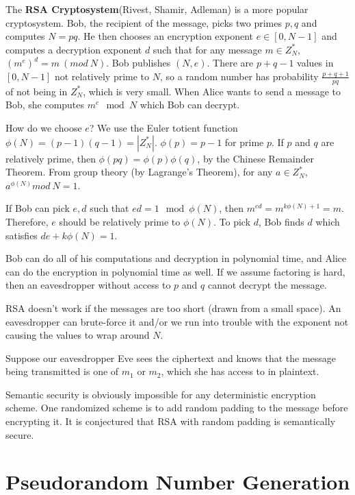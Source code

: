 \documentclass[twoside]{article}
\begin{document}
The \textbf{RSA Cryptosystem}(Rivest, Shamir, Adleman) is a more popular cryptosystem.  Bob, the recipient of the message, picks two primes $p,q$ and computes $N=pq$.  He then chooses an encryption exponent $e\in [0,N-1]$ and computes a decryption exponent $d$ such that for any message $m\in Z_N^*$, $(m^e)^d=m\ (mod\  N)$.  Bob publishes $(N,e)$.  There are $p+q-1$ values in $[0,N-1]$ not relatively prime to $N$, so a random number has probability $\frac{p+q+1}{pq}$ of not being in $Z_N^*$, which is very small.  When Alice wants to send a message to Bob, she computes $m^e\mod N$ which Bob can decrypt.

How do we choose $e$?  We use the Euler totient function $\phi(N)=(p-1)(q-1)=|Z_N^*|$.  $\phi(p)=p-1$ for prime $p$.  If $p$ and $q$ are relatively prime, then $\phi(pq)=\phi(p)\phi(q)$, by the Chinese Remainder Theorem.  From group theory (by Lagrange's Theorem), for any $a\in Z_N^*$, $a^{\phi(N)}mod\  N=1$.

If Bob can pick $e,d$ such that $ed=1\mod \phi(N)$, then $m^{ed}=m^{k\phi(N)+1}=m$.  Therefore, $e$ should be relatively prime to $\phi(N)$.  To pick $d$, Bob finds $d$ which satisfies $de+k\phi(N)=1$.  

Bob can do all of his computations and decryption in polynomial time, and Alice can do the encryption in polynomial time as well.  If we assume factoring is hard, then an eavesdropper without access to $p$ and $q$ cannot decrypt the message.

RSA doesn't work if the messages are too short (drawn from a small space).  An eavesdropper can brute-force it and/or we run into trouble with the exponent not causing the values to wrap around $N$.

Suppose our eavesdropper Eve sees the ciphertext and knows that the message being transmitted is one of $m_1$ or $m_2$, which she has access to in plaintext.

Semantic security is obviously impossible for any deterministic encryption scheme.  One randomized scheme is to add random padding to the message before encrypting it.  It is conjectured that RSA with random padding is semantically secure.

\section*{Pseudorandom Number Generation}
\end{document}
